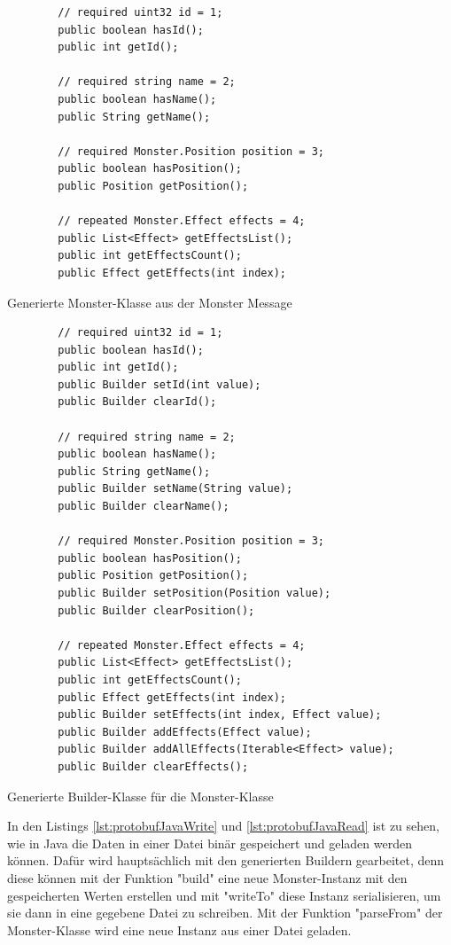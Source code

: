 \begin{listing}[htp]
    \begin{verbatim} 
        // required uint32 id = 1;
        public boolean hasId();
        public int getId();

        // required string name = 2;
        public boolean hasName();
        public String getName();

        // required Monster.Position position = 3;
        public boolean hasPosition();
        public Position getPosition();

        // repeated Monster.Effect effects = 4;
        public List<Effect> getEffectsList();
        public int getEffectsCount();
        public Effect getEffects(int index);
    \end{verbatim}
    \caption{Generierte Monster-Klasse aus der Monster Message}
    \label{lst:protoJavaGeneratedMonster}
\end{listing}

\begin{listing}[htp]
    \begin{verbatim} 
        // required uint32 id = 1;
        public boolean hasId();
        public int getId();
        public Builder setId(int value);
        public Builder clearId();

        // required string name = 2;
        public boolean hasName();
        public String getName();
        public Builder setName(String value);
        public Builder clearName();

        // required Monster.Position position = 3;
        public boolean hasPosition();
        public Position getPosition();
        public Builder setPosition(Position value);
        public Builder clearPosition();

        // repeated Monster.Effect effects = 4;
        public List<Effect> getEffectsList();
        public int getEffectsCount();
        public Effect getEffects(int index);
        public Builder setEffects(int index, Effect value);
        public Builder addEffects(Effect value);
        public Builder addAllEffects(Iterable<Effect> value);
        public Builder clearEffects();
    \end{verbatim}
    \caption{Generierte Builder-Klasse für die Monster-Klasse}
    \label{lst:protoJavaGeneratedBuilder}
\end{listing}

In den Listings \ref{lst:protobufJavaWrite} und \ref{lst:protobufJavaRead} ist zu sehen, wie in Java die Daten in einer Datei binär gespeichert und geladen werden können. Dafür wird hauptsächlich mit den generierten Buildern gearbeitet, denn diese können mit der Funktion "build" eine neue Monster-Instanz mit den gespeicherten Werten erstellen und mit "writeTo" diese Instanz serialisieren, um sie dann in eine gegebene Datei zu schreiben. Mit der Funktion "parseFrom" der Monster-Klasse wird eine neue Instanz aus einer Datei geladen. 


